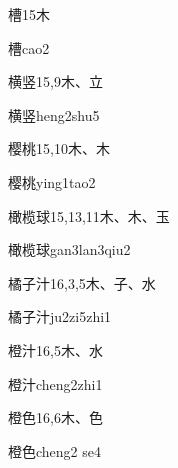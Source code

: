 \begin{entry}{槽}{15}{⽊}
  \begin{phonetics}{槽}{cao2}
  \end{phonetics}
\end{entry}

\begin{entry}{横竖}{15,9}{⽊、⽴}
  \begin{phonetics}{横竖}{heng2shu5}
  \end{phonetics}
\end{entry}

\begin{entry}{樱桃}{15,10}{⽊、⽊}
  \begin{phonetics}{樱桃}{ying1tao2}
  \end{phonetics}
\end{entry}

\begin{entry}{橄榄球}{15,13,11}{⽊、⽊、⽟}
  \begin{phonetics}{橄榄球}{gan3lan3qiu2}
  \end{phonetics}
\end{entry}

\begin{entry}{橘子汁}{16,3,5}{⽊、⼦、⽔}
  \begin{phonetics}{橘子汁}{ju2zi5zhi1}
  \end{phonetics}
\end{entry}

\begin{entry}{橙汁}{16,5}{⽊、⽔}
  \begin{phonetics}{橙汁}{cheng2zhi1}
  \end{phonetics}
\end{entry}

\begin{entry}{橙色}{16,6}{⽊、⾊}
  \begin{phonetics}{橙色}{cheng2 se4}
  \end{phonetics}
\end{entry}


